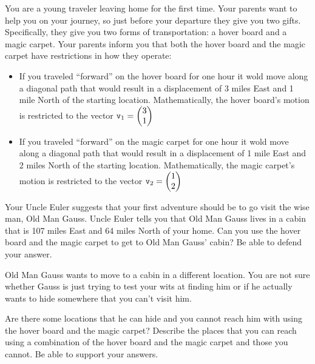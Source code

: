 \begin{problem}
    You are a young traveler leaving home for the first time.  Your parents want to help
    you on your journey, so just before your departure they give you two gifts.
    Specifically, they give you two forms of transportation: a hover board and a magic
    carpet.  Your parents inform you that both the hover board and the magic carpet have
    restrictions in how they operate:
    \begin{itemize}
        \item If you traveled ``forward'' on the hover board for one hour it wold move along a
            diagonal path that would result in a displacement of 3 miles East and 1 mile
            North of the starting location.  Mathematically, the hover board's motion is
            restricted to the vector $\texttt{v}_1 = \begin{pmatrix} 3\\1\end{pmatrix}$
        \item If you traveled ``forward'' on the magic carpet for one hour it wold move along a
            diagonal path that would result in a displacement of 1 mile East and 2 miles
            North of the starting location.  Mathematically, the magic carpet's motion is
            restricted to the vector $\texttt{v}_2 = \begin{pmatrix} 1\\2\end{pmatrix}$
    \end{itemize}
    Your Uncle Euler suggests that your first adventure should be to go visit the wise
    man, Old Man Gauss.  Uncle Euler tells you that Old Man Gauss lives in a cabin that is
    107 miles East and 64 miles North of your home.  Can you use the hover board and the
    magic carpet to get to Old Man Gauss' cabin?  Be able to defend your answer.
\end{problem}

\begin{problem}
    Old Man Gauss wants to move to a cabin in a different location.  You are not sure
    whether Gauss is just trying to test your wits at finding him or if he actually wants
    to hide somewhere that you can't visit him.  

    Are there some locations that he can hide and you cannot reach him with using the
    hover board and the magic carpet?  Describe the places that you can reach using a
    combination of the hover board and the magic carpet and those you cannot.  Be able to
    support your answers.
\end{problem}

